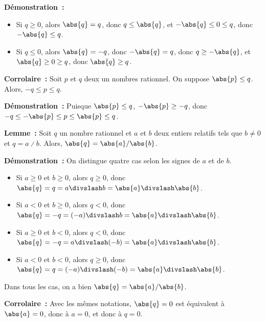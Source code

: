 \noindent\textbf{Démonstration :} 
    \begin{itemize}
        \item Si $q \geq 0$, alors $\abs{q} = q$, donc $q \leq \abs{q}$, et $-\abs{q} \leq 0 \leq q$, donc $- \abs{q} \leq q$.
        \item Si $q \leq 0$, alors $\abs{q} = -q$, donc $-\abs{q} = q$, donc $q \geq -\abs{q}$, et $\abs{q} \geq 0 \geq q$, donc $\abs{q} \geq q$.
    \end{itemize}

    \done

\medskip

\noindent\textbf{Corrolaire :} Soit $p$ et $q$ deux un nombres rationnel.
    On suppose $\abs{p} \leq q$.
    Alors, $-q \leq p \leq q$.

\medskip

\noindent\textbf{Démonstration :} 
    Puisque $\abs{p} \leq q$, $-\abs{p} \geq -q$, donc $-q \leq -\abs{p} \leq p \leq \abs{p} \leq q$. 

    \done

\medskip

\noindent\textbf{Lemme :} Soit $q$ un nombre rationnel et $a$ et $b$ deux entiers relatifs tels que $b \neq 0$ et $q = a \divslash b$.
    Alors, $\abs{q} = \abs{a} / \abs{b}$.

\medskip

\noindent\textbf{Démonstration :} On distingue quatre cas selon les signes de $a$ et de $b$.
    \begin{itemize}[nosep]
        \item Si $a \geq 0$ et $b \geq 0$, alors $q \geq 0$, donc $\abs{q} = q = a \divslash b = \abs{a} \divslash \abs{b}$.
        \item Si $a < 0$ et $b \geq 0$, alors $q < 0$, donc $\abs{q} = - q = (-a) \divslash b = \abs{a} \divslash \abs{b}$.
        \item Si $a \geq 0$ et $b < 0$, alors $q < 0$, donc $\abs{q} = - q = a \divslash (-b) = \abs{a} \divslash \abs{b}$.
        \item Si $a < 0$ et $b < 0$, alors $q \geq 0$, donc $\abs{q} = q = (-a) \divslash (-b) = \abs{a} \divslash \abs{b}$.
    \end{itemize}
    Dans tous les cas, on a bien $\abs{q} = \abs{a} / \abs{b}$.

    \done

\medskip

\noindent\textbf{Corrolaire :} Avec les mêmes notations, $\abs{q} = 0$ est équivalent à $\abs{a} = 0$, donc à $a = 0$, et donc à $q = 0$.

